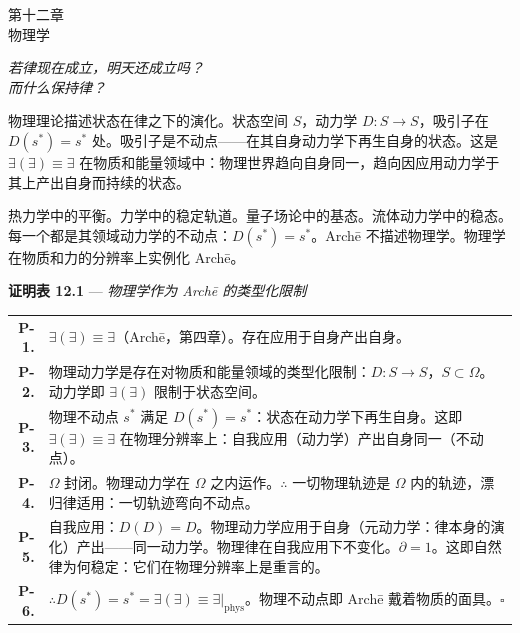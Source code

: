 \documentclass[10pt, openany, oneside]{book}
\renewcommand{\footnotesize}{\fontsize{8.5}{11}\selectfont}
\renewcommand{\large}{\fontsize{11.5}{14}\selectfont}
\renewcommand{\huge}{\fontsize{17}{21}\selectfont}
\begin{document}
\newpage

\begin{center}
    {\huge\scshape 第十二章}\\[0.3em]
    {\large\scshape 物理学}
\end{center}

\vspace{1.5em}

\begin{center}
    \itshape
    若律现在成立，明天还成立吗？\\
    而什么保持律？
\end{center}

\vspace{2em}


\noindent 物理理论描述状态在律之下的演化。状态空间 $S$，动力学 $D: S \to S$，吸引子在 $D(s^*) = s^*$ 处。吸引子是不动点——在其自身动力学下再生自身的状态。这是 $\exists(\exists) \equiv \exists$ 在物质和能量领域中：物理世界趋向自身同一，趋向因应用动力学于其上产出自身而持续的状态。

热力学中的平衡。力学中的稳定轨道。量子场论中的基态。流体动力学中的稳态。每一个都是其领域动力学的不动点：$D(s^*) = s^*$。Arch\={e} 不描述物理学。物理学在物质和力的分辨率上实例化 Arch\={e}。

\vspace{0.5em}

\textbf{证明表 12.1} --- \textit{物理学作为 Arch\={e} 的类型化限制}

\vspace{0.5em}

{\footnotesize
\noindent\begin{tabular}{r p{}}
\textbf{P-1.} & $\exists(\exists) \equiv \exists$（Arch\={e}，第四章）。存在应用于自身产出自身。\\[0.3em]
\textbf{P-2.} & 物理动力学是存在对物质和能量领域的类型化限制：$D: S \to S$，$S \subset \Omega$。动力学即 $\exists(\exists)$ 限制于状态空间。\\[0.3em]
\textbf{P-3.} & 物理不动点 $s^*$ 满足 $D(s^*) = s^*$：状态在动力学下再生自身。这即 $\exists(\exists) \equiv \exists$ 在物理分辨率上：自我应用（动力学）产出自身同一（不动点）。\\[0.3em]
\textbf{P-4.} & $\Omega$ 封闭。物理动力学在 $\Omega$ 之内运作。$\therefore$ 一切物理轨迹是 $\Omega$ 内的轨迹，漂归律适用：一切轨迹弯向不动点。\\[0.3em]
\textbf{P-5.} & 自我应用：$D(D) = D$。物理动力学应用于自身（元动力学：律本身的演化）产出——同一动力学。物理律在自我应用下不变化。$\partial = 1$。这即自然律为何稳定：它们在物理分辨率上是重言的。\\[0.3em]
\textbf{P-6.} & $\therefore D(s^*) = s^* = \exists(\exists) \equiv \exists|_{\text{phys}}$。物理不动点即 Arch\={e} 戴着物质的面具。$\square$ \\[0.3em]
\end{tabular}
}
\end{document}
